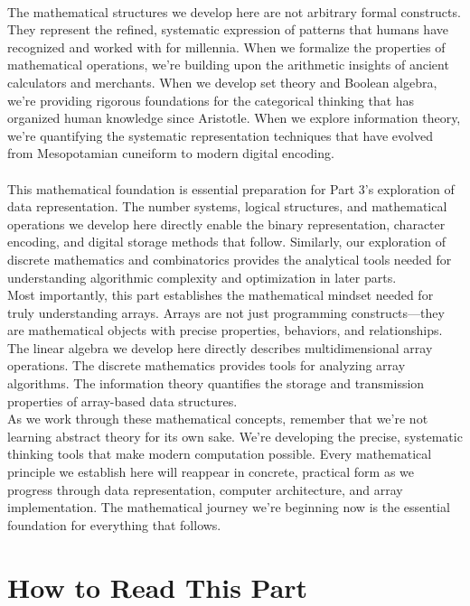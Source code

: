 \documentclass[12pt, oneside, openany]{book}
\begin{document}
\\
The mathematical structures we develop here are not arbitrary formal constructs. They represent the refined, systematic expression of patterns that humans have recognized and worked with for millennia. When we formalize the properties of mathematical operations, we're building upon the arithmetic insights of ancient calculators and merchants. When we develop set theory and Boolean algebra, we're providing rigorous foundations for the categorical thinking that has organized human knowledge since Aristotle. When we explore information theory, we're quantifying the systematic representation techniques that have evolved from Mesopotamian cuneiform to modern digital encoding.\\
\\
This mathematical foundation is essential preparation for Part 3's exploration of data representation. The number systems, logical structures, and mathematical operations we develop here directly enable the binary representation, character encoding, and digital storage methods that follow. Similarly, our exploration of discrete mathematics and combinatorics provides the analytical tools needed for understanding algorithmic complexity and optimization in later parts.\\
Most importantly, this part establishes the mathematical mindset needed for truly understanding arrays. Arrays are not just programming constructs—they are mathematical objects with precise properties, behaviors, and relationships. The linear algebra we develop here directly describes multidimensional array operations. The discrete mathematics provides tools for analyzing array algorithms. The information theory quantifies the storage and transmission properties of array-based data structures.\\
As we work through these mathematical concepts, remember that we're not learning abstract theory for its own sake. We're developing the precise, systematic thinking tools that make modern computation possible. Every mathematical principle we establish here will reappear in concrete, practical form as we progress through data representation, computer architecture, and array implementation. The mathematical journey we're beginning now is the essential foundation for everything that follows.

\newpage
\section*{How to Read This Part}
\end{document}

